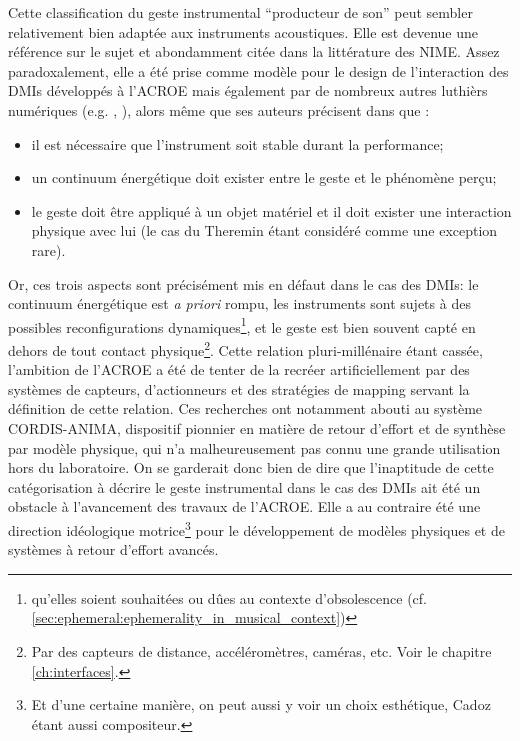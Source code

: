 \noindent Cette classification du geste instrumental ``producteur de son'' peut sembler relativement bien adaptée aux instruments acoustiques. Elle est devenue une référence sur le sujet et abondamment citée dans la littérature des \gls{NIME}. Assez paradoxalement, elle a été prise comme modèle pour le design de l'interaction des \glspl{DMI} développés à l'\gls{ACROE} mais également par de nombreux autres luthièrs numériques (e.g. \cite{arfib_strategies_2002}, \cite{schwarz_sound_2012}), alors même que ses auteurs précisent dans \cite{cadoz_geste_1994, cadoz_gesture_2000} que :
\vspace{-1em}
	\begin{itemize}[noitemsep]
		\item il est nécessaire que l'instrument soit stable durant la performance;
		\item un continuum énergétique doit exister entre le geste et le phénomène perçu;
		\item le geste doit être appliqué à un objet matériel et il doit exister une interaction physique avec lui (le cas du Theremin étant considéré comme une exception rare).	
\end{itemize}
\noindent Or, ces trois aspects sont précisément mis en défaut dans le cas des \glspl{DMI}: le continuum énergétique est \textit{a priori} rompu, les instruments sont sujets à des possibles reconfigurations dynamiques\footnote{qu'elles soient souhaitées ou dûes au contexte d'obsolescence (cf. \ref{sec:ephemeral:ephemerality_in_musical_context})}, et le geste est bien souvent capté en dehors de tout contact physique\footnote{Par des capteurs de distance, accéléromètres, caméras, etc. Voir le chapitre \ref{ch:interfaces}.}. Cette relation pluri-millénaire étant cassée, l'ambition de l'\gls{ACROE} a été de tenter de la recréer artificiellement par des systèmes de capteurs, d'actionneurs et des stratégies de mapping servant la définition de cette relation. Ces recherches ont notamment abouti au système \gls{CORDIS-ANIMA}, dispositif pionnier en matière de retour d'effort et de synthèse par modèle physique, qui n'a malheureusement pas connu une grande utilisation hors du laboratoire. On se garderait donc bien de dire que l'inaptitude de cette catégorisation à décrire le geste instrumental dans le cas des \glspl{DMI} ait été un obstacle à l'avancement des travaux de l'\gls{ACROE}. Elle a au contraire été une direction idéologique motrice\footnote{Et d'une certaine manière, on peut aussi y voir un choix esthétique, Cadoz étant aussi compositeur.} pour le développement de modèles physiques et de systèmes à retour d'effort avancés.\\
